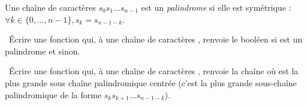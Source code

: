 Une chaîne de caractères $s_0s_1\dots s_{n-1}$ est un \emph{palindrome} si elle est \og symétrique\fg{} : $\forall k \in \{0,\dots,n-1\}, s_k = s_{n-1-k}$.


\question\ \'Ecrire une fonction  qui, à une chaîne de caractères , renvoie le booléen  si  est un palindrome et  sinon.

\question\ \'Ecrire une fonction  qui, à une chaîne de caractères , renvoie la chaîne  où  est la plus grande sous chaîne palindromique centrée (c'est la plus grande sous-chaîne palindromique de la forme $s_ks_{k+1}\dots s_{n-1-k}$).

